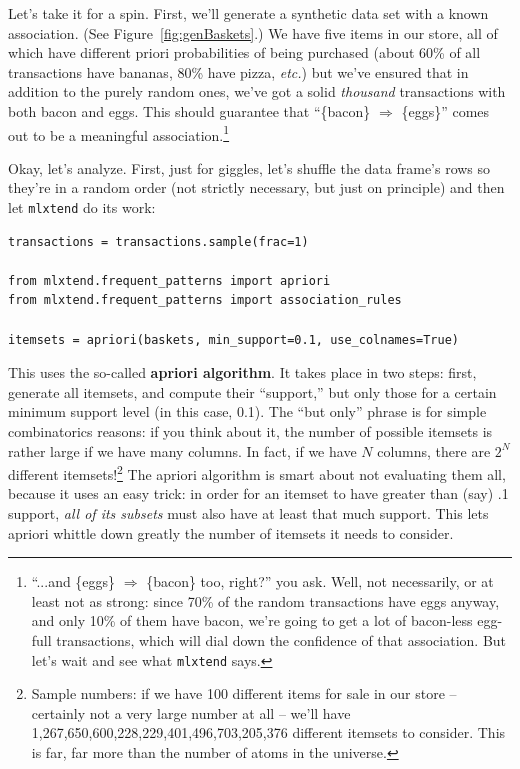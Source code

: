 Let's take it for a spin. First, we'll generate a synthetic data set with a
known association. (See Figure~\ref{fig:genBaskets}.) We have five items in
our store, all of which have different priori probabilities of being purchased
(about 60\% of all transactions have bananas, 80\% have pizza, \textit{etc.})
but we've ensured that in addition to the purely random ones, we've got a
solid \textit{thousand} transactions with both bacon and eggs. This should
guarantee that ``\{bacon\} $\Rightarrow$ \{eggs\}'' comes out to be a
meaningful association.\footnote{``...and \{eggs\} $\Rightarrow$ \{bacon\}
too, right?'' you ask. Well, not necessarily, or at least not as strong: since
70\% of the random transactions have eggs anyway, and only 10\% of them have
bacon, we're going to get a lot of bacon-less egg-full transactions, which
will dial down the confidence of that association. But let's wait and see what
\texttt{mlxtend} says.}

Okay, let's analyze. First, just for giggles, let's shuffle the data frame's
rows so they're in a random order (not strictly necessary, but just on
principle) and then let \texttt{mlxtend} do its work:

\begin{Verbatim}[fontsize=\small,samepage=true,frame=single]
transactions = transactions.sample(frac=1)

from mlxtend.frequent_patterns import apriori
from mlxtend.frequent_patterns import association_rules

itemsets = apriori(baskets, min_support=0.1, use_colnames=True)
\end{Verbatim}

This uses the so-called \textbf{apriori algorithm}. It takes place in two
steps: first, generate all itemsets, and compute their ``support,'' but only
those for a certain minimum support level (in this case, 0.1). The ``but
only''
phrase is for simple combinatorics reasons: if you think about it, the number
of possible itemsets is rather large if we have many columns. In fact, if we
have $N$ columns, there are $2^N$ different itemsets!\footnote{Sample numbers:
if we have 100 different items for sale in our store -- certainly not a very
large number at all -- we'll have 1,267,650,600,228,229,401,496,703,205,376
different itemsets to consider. This is far, far more than the number of atoms
in the universe.} The apriori algorithm is smart about not evaluating them
all, because it uses an easy trick: in order for an itemset to have greater
than (say) .1 support, \textit{all of its subsets} must also have at least
that much support. This lets apriori whittle down greatly the number of
itemsets it needs to consider.

